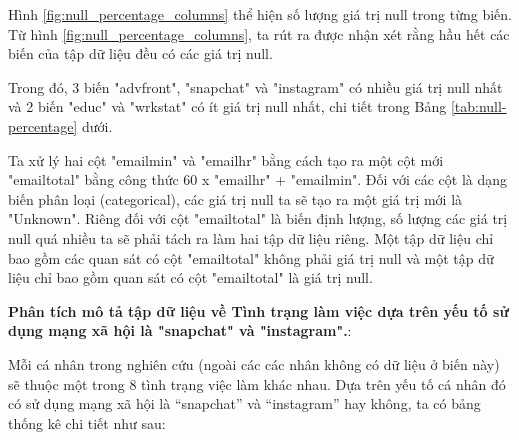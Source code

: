 Hình \ref{fig:null_percentage_columns} thể hiện số lượng giá trị null trong từng biến. Từ hình \ref{fig:null_percentage_columns}, ta rút ra được nhận xét rằng hầu hết các biến của tập dữ liệu đều có các giá trị null.

Trong đó, 3 biến "advfront", "snapchat" và "instagram" có nhiều giá trị null nhất và 2 biến "educ" và "wrkstat" có ít giá trị null nhất, chi tiết trong Bảng \ref{tab:null-percentage} dưới.

\begin{table}[h!]
    \centering
    \caption{Tỷ lệ giá trị null trong từng cột}
    \label{tab:null-percentage}
\end{table}

Ta xử lý hai cột "emailmin" và "emailhr" bằng cách tạo ra một cột mới "emailtotal" bằng công thức 60 x "emailhr" + "emailmin".
Đối với các cột là dạng biến phân loại (categorical), các giá trị null ta sẽ tạo ra một giá trị mới là "Unknown".
Riêng đối với cột "emailtotal" là biến định lượng, số lượng các giá trị null quá nhiều ta sẽ phải tách ra làm hai tập dữ liệu riêng.
Một tập dữ liệu chỉ bao gồm các quan sát có cột "emailtotal" không phải giá trị null và một tập dữ liệu chỉ bao gồm quan sát có cột "emailtotal" là giá trị null.

\textbf{Phân tích mô tả tập dữ liệu về Tình trạng làm việc dựa trên yếu tố sử dụng mạng xã hội là "snapchat" và "instagram".}:

Mỗi cá nhân trong nghiên cứu (ngoài các các nhân không có dữ liệu ở biến này) sẽ thuộc một trong 8 tình trạng việc làm khác nhau.  Dựa trên yếu tố cá nhân đó có sử dụng mạng xã hội là “snapchat” và “instagram” hay không, ta có bảng thống kê chi tiết như sau:

